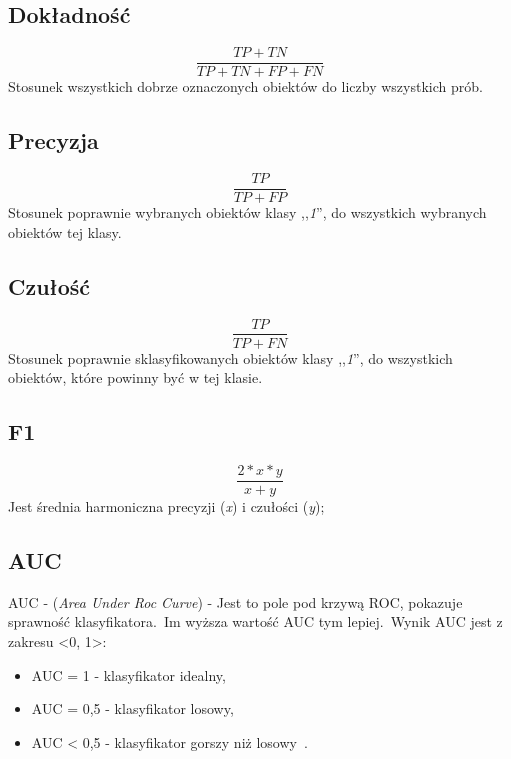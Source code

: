 \subsection{Dokładność}
\begin{equation}\label{math:acc}
    \frac{TP + TN}{TP + TN + FP + FN}
\end{equation}
Stosunek wszystkich dobrze oznaczonych obiektów do liczby wszystkich prób.

\subsection{Precyzja}
\begin{equation}\label{math:prec}
    \frac{TP}{TP + FP}
\end{equation}
Stosunek poprawnie wybranych obiektów klasy ,,\textit{1}'', do wszystkich wybranych obiektów tej klasy.

\subsection{Czułość}
\begin{equation}\label{math:rec}
    \frac{TP}{TP + FN}
\end{equation}
Stosunek poprawnie sklasyfikowanych obiektów klasy ,,\textit{1}'', do wszystkich obiektów, które powinny być w tej klasie.

\subsection{F1}
\begin{equation}\label{math:f1}
   \frac{2*x*y}{x + y}
\end{equation}
Jest średnia harmoniczna precyzji (\textit{x}) i czułości (\textit{y});


\subsection{AUC}
AUC - (\textit{Area Under Roc Curve}) - Jest to pole pod krzywą ROC, pokazuje sprawność klasyfikatora.\ Im wyższa wartość AUC tym lepiej.\ Wynik AUC jest z zakresu <0, 1>:
\begin{itemize}
    \item AUC = 1 - klasyfikator idealny,
    \item AUC = 0,5 - klasyfikator losowy,
    \item AUC < 0,5 - klasyfikator gorszy niż losowy~\cite{Algolytics}.
\end{itemize}
